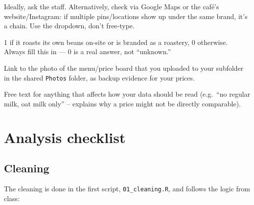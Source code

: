 \documentclass[11pt,a4paper]{article}
\begin{document}
\begin{description}
\begin{itemize}
  \end{itemize}
  Ideally, ask the staff. Alternatively, check via Google Maps or the caf\'e's website/Instagram: if multiple pins/locations show up under the same brand, it's a chain. Use the dropdown, don't free-type.
\item[Is Roastery (0/1)] 1 if it roasts its own beans on-site or is branded as a roastery, 0 otherwise. Always fill this in --- 0 is a real answer, not ``unknown.''
\item[Photo Link] Link to the photo of the menu/price board that you uploaded to your subfolder in the shared \texttt{Photos} folder, as backup evidence for your prices.
\item[Note] Free text for anything that affects how your data should be read (e.g.\ ``no regular milk, oat milk only'' -- explains why a price might not be directly comparable).
\end{description}

\clearpage
\section{Analysis checklist}\label{sec:reporting}

\subsection{Cleaning}\label{sec:chk-cleaning}

The cleaning is done in the first script, \texttt{01\_cleaning.R}, and follows the logic from class:
\end{document}
